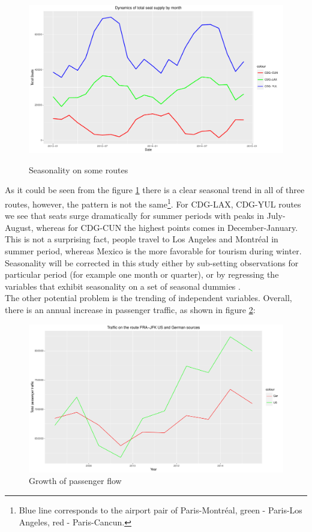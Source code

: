 \documentclass[titlepage, 11pt]{article}
\begin{document}
\begin{figure}[ht]
\centering
\caption{Seasonality on some routes}
\includegraphics[width=200 mm]{Rplot07.pdf}
\label{season}
\end{figure}
\tab As it could be seen from the figure \ref{season} there is a clear seasonal trend in all of three routes, however, the pattern is not the same\footnote{Blue line corresponds to the airport pair of Paris-Montréal, green - Paris-Los Angeles, red - Paris-Cancun.}. For CDG-LAX, CDG-YUL routes we see that seats surge dramatically for summer periods with peaks in July-August, whereas for CDG-CUN the highest points comes in December-January. This is not a surprising fact, people travel to Los Angeles and Montréal in summer period, whereas Mexico is the more favorable for tourism during winter. \\
\tab Seasonality will be corrected in this study either by sub-setting observations for particular period (for example one month or quarter), or by regressing the variables that exhibit seasonality on a set of seasonal dummies \cite{Hsiao}. 
\\
\tab The other potential problem is the trending of independent variables. Overall, there is an annual increase in passenger traffic, as shown in figure \ref{traffic}: 
\begin{figure}[h!]
\centering
\caption{Growth of passenger flow}
\label{traffic}
\includegraphics[width=200 mm]{traffic1.pdf}
\end{figure}
\end{document}
